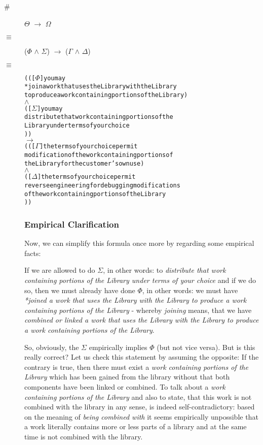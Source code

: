 \begin{description}
  \item[\#] $\Theta$ $\rightarrow$ $\Omega$
  \item[$\equiv$] ($\Phi$ $\wedge$ $\Sigma$) $\rightarrow$ ($\Gamma$ $\wedge$
  $\Delta$)
  \item[$\equiv$]
\begin{alltt}   
  ( ( [\(\Phi\)] you may 
       *join a work that uses the Library with the Library
       to produce a work containing portions of the Library )
  \(\wedge\)
  ( [\(\Sigma\)] you may 
        distribute that work containing portions of the 
        Library under terms of your choice 
) )
\(\rightarrow\)
( ( [\(\Gamma\)] the terms of your choice permit 
        modification of the work containing portions of 
        the Library for the customer's own use )
  \(\wedge\)
  ( [\(\Delta\)] the terms of your choice permit
        reverse engineering for debugging modifications 
        of the work containing portions of the Library   
) )
\end{alltt}

\subsubsection{Empirical Clarification}

Now, we can simplify this formula once more by regarding some empirical facts:

If we are allowed to do $\Sigma$, in other words: to \emph{distribute that work
containing portions of the Library under terms of your choice} and if we do so,
then we must already have done $\Phi$, in other words: we must have
\emph{*joined a work that uses the Library with the Library to produce a work
containing portions of the Library} - whereby \emph{joining} means, that we have
\emph{combined or linked a work that uses the Library with the Library to
produce a work containing portions of the Library}.

So, obviously, the $\Sigma$ empirically implies $\Phi$ (but not vice versa). But
is this really correct? Let us check this statement by assuming the opposite:
If the contrary is true, then there must exist a \emph{work containing portions
of the Library} which has been gained from the library without that both
components have been linked or combined. To talk about a \emph{work containing
portions of the Library} and also to state, that this work is not combined with
the library in any sense, is indeed self-contradictory: based on the meaning of
\emph{being combined with} it seems empirically unpossible that a work
literally contains more or less parts of a library and at the same time is not
combined with the library.


\end{description}

